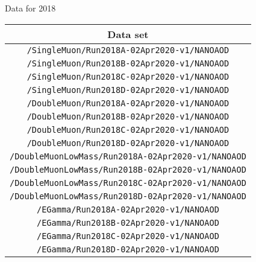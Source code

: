 Data for 2018
\begin{table}[!h]
\label{tab:datasets2018}
\begin{center}
{\footnotesize
\begin{tabular}{c}
\hline
Data set  \\
\hline
\texttt{/SingleMuon/Run2018A-02Apr2020-v1/NANOAOD} \\
\texttt{/SingleMuon/Run2018B-02Apr2020-v1/NANOAOD}\\
\texttt{/SingleMuon/Run2018C-02Apr2020-v1/NANOAOD}\\
\texttt{/SingleMuon/Run2018D-02Apr2020-v1/NANOAOD}\\
\texttt{/DoubleMuon/Run2018A-02Apr2020-v1/NANOAOD}\\
\texttt{/DoubleMuon/Run2018B-02Apr2020-v1/NANOAOD}\\
\texttt{/DoubleMuon/Run2018C-02Apr2020-v1/NANOAOD}\\
\texttt{/DoubleMuon/Run2018D-02Apr2020-v1/NANOAOD}\\
\texttt{/DoubleMuonLowMass/Run2018A-02Apr2020-v1/NANOAOD}\\
\texttt{/DoubleMuonLowMass/Run2018B-02Apr2020-v1/NANOAOD}\\
\texttt{/DoubleMuonLowMass/Run2018C-02Apr2020-v1/NANOAOD}\\
\texttt{/DoubleMuonLowMass/Run2018D-02Apr2020-v1/NANOAOD}\\
\texttt{/EGamma/Run2018A-02Apr2020-v1/NANOAOD}\\
\texttt{/EGamma/Run2018B-02Apr2020-v1/NANOAOD}\\
\texttt{/EGamma/Run2018C-02Apr2020-v1/NANOAOD}\\
\texttt{/EGamma/Run2018D-02Apr2020-v1/NANOAOD}\\
\end{tabular}
} %
\end{center}
\end{table}


\clearpage

